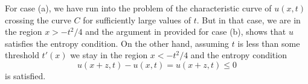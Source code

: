 \begin{solution}
  For case (a), we have run into the problem of the characteristic curve of
  \(u(x,t)\) crossing the curve \(C\) for sufficiently large values of
  \(t\). But in that case, we are in the region \(x>-t^2/4\) and the
  argument in provided for case (b), shows that \(u\) satisfies the entropy
  condition. On the other hand, assuming \(t\) is less than some threshold
  \(t'(x)\) we stay in the region \(x<-t^2/4\) and the entropy condition
  \[
    u(x+z,t)-u(x,t)=u(x+z,t)\leq 0
  \]
  is satisfied.
\end{solution}

